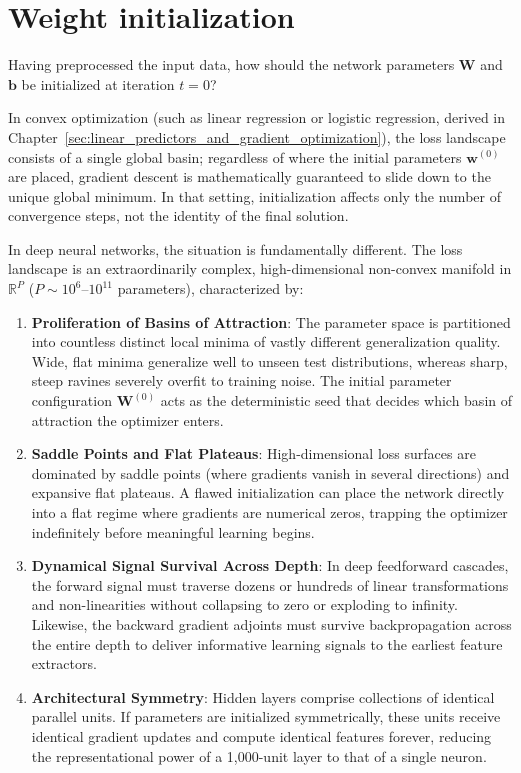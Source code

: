 \section{Weight initialization}
\label{sec:weight_initialization_theory}

Having preprocessed the input data, how should the network parameters $\mathbf{W}$ and $\mathbf{b}$ be initialized at iteration $t = 0$? 

In convex optimization (such as linear regression or logistic regression, derived in Chapter~\ref{sec:linear_predictors_and_gradient_optimization}), the loss landscape consists of a single global basin; regardless of where the initial parameters $\mathbf{w}^{(0)}$ are placed, gradient descent is mathematically guaranteed to slide down to the unique global minimum. In that setting, initialization affects only the number of convergence steps, not the identity of the final solution.

In deep neural networks, the situation is fundamentally different. The loss landscape is an extraordinarily complex, high-dimensional non-convex manifold in $\mathbb{R}^P$ ($P \sim 10^6$--$10^{11}$ parameters), characterized by:
\begin{enumerate}[leftmargin=*]
  \item \textbf{Proliferation of Basins of Attraction}: The parameter space is partitioned into countless distinct local minima of vastly different generalization quality. Wide, flat minima generalize well to unseen test distributions, whereas sharp, steep ravines severely overfit to training noise. The initial parameter configuration $\mathbf{W}^{(0)}$ acts as the deterministic seed that decides which basin of attraction the optimizer enters.
  \item \textbf{Saddle Points and Flat Plateaus}: High-dimensional loss surfaces are dominated by saddle points (where gradients vanish in several directions) and expansive flat plateaus. A flawed initialization can place the network directly into a flat regime where gradients are numerical zeros, trapping the optimizer indefinitely before meaningful learning begins.
  \item \textbf{Dynamical Signal Survival Across Depth}: In deep feedforward cascades, the forward signal must traverse dozens or hundreds of linear transformations and non-linearities without collapsing to zero or exploding to infinity. Likewise, the backward gradient adjoints must survive backpropagation across the entire depth to deliver informative learning signals to the earliest feature extractors.
  \item \textbf{Architectural Symmetry}: Hidden layers comprise collections of identical parallel units. If parameters are initialized symmetrically, these units receive identical gradient updates and compute identical features forever, reducing the representational power of a 1,000-unit layer to that of a single neuron.
\end{enumerate}

